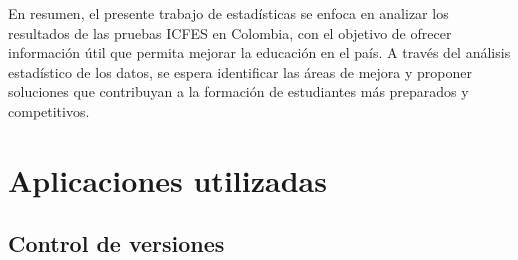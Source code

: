 \documentclass{article}
\begin{document}
En resumen, el presente trabajo de estadísticas se enfoca en analizar los resultados de las pruebas ICFES en Colombia, con el objetivo de ofrecer información útil que permita mejorar la educación en el país. A través del análisis estadístico de los datos, se espera identificar las áreas de mejora y proponer soluciones que contribuyan a la formación de estudiantes más preparados y competitivos.\hfill \break
\newline
\newline
\newline
\newline
\newline
\newline
\newline
\newline
\newline


\section{Aplicaciones utilizadas}

\subsection{Control de versiones}
\end{document}

